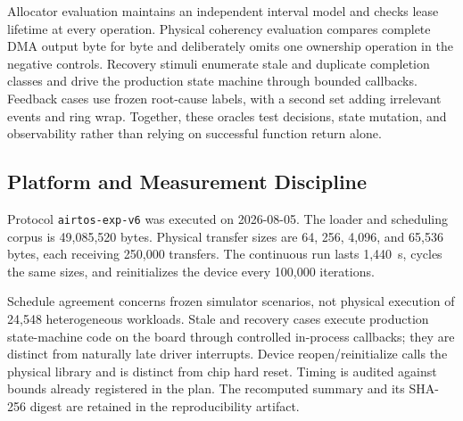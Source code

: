 \documentclass[lettersize,journal]{IEEEtran}
\begin{document}
Allocator evaluation maintains an independent interval model and checks lease
lifetime at every operation. Physical coherency evaluation compares complete
DMA output byte for byte and deliberately omits one ownership operation in the
negative controls. Recovery stimuli enumerate stale and duplicate completion
classes and drive the production state machine through bounded callbacks.
Feedback cases use frozen root-cause labels, with a second set adding irrelevant
events and ring wrap. Together, these oracles test decisions, state mutation,
and observability rather than relying on successful function return alone.

\subsection{Platform and Measurement Discipline}
Protocol \texttt{airtos-exp-v6} was executed on 2026-08-05. The loader and
scheduling corpus is 49,085,520 bytes. Physical transfer sizes are 64, 256,
4,096, and 65,536 bytes, each receiving 250,000 transfers. The continuous run
lasts 1,440~s, cycles the same sizes, and reinitializes the device every 100,000
iterations.

Schedule agreement concerns frozen simulator scenarios, not physical execution
of 24,548 heterogeneous workloads. Stale and recovery cases execute production
state-machine code on the board through controlled in-process callbacks; they
are distinct from naturally late driver interrupts. Device reopen/reinitialize
calls the physical library and is distinct from chip hard reset. Timing is
audited against bounds already registered in the plan. The recomputed summary
and its SHA-256 digest are retained in the reproducibility artifact.
\end{document}

